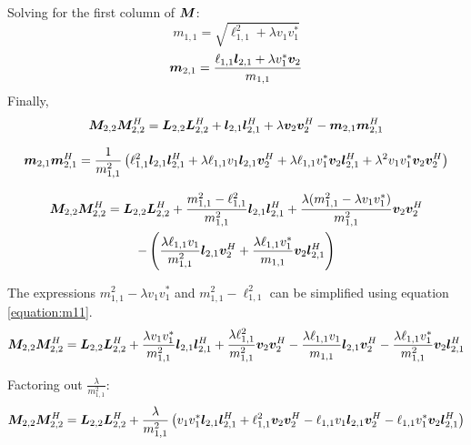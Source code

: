 \begin{appendices}
Solving for the first column of $\bm{M}$:
\begin{equation} \label{equation:m11}
m_{1,1} = \sqrt{\ell_{1,1}^2 + \lambda v_1 v_1^{*}}
\end{equation}
\begin{equation}
\bm{m}_{2,1} = \frac{\ell_{1,1}\bm{l}_{2,1} + \lambda v_1^{*}\bm{v}_2}{m_{1,1}}
\end{equation}
Finally,
\begin{equation}
\bm{M}_{2,2}\bm{M}_{2,2}^H = \bm{L}_{2,2}\bm{L}_{2,2}^H + \bm{l}_{2,1}\bm{l}_{2,1}^H + \lambda\bm{v}_2\bm{v}_2^H - \bm{m}_{2,1}\bm{m}_{2,1}^H
\end{equation}

\begin{equation}
\bm{m}_{2,1}\bm{m}_{2,1}^H = \frac{1}{m_{1,1}^2}\left(\ell_{1,1}^2\bm{l}_{2,1}\bm{l}_{2,1}^H + \lambda\ell_{1,1}v_1\bm{l}_{2,1}\bm{v}_2^H + \lambda\ell_{1,1}v_1^{*}\bm{v}_2\bm{l}_{2,1}^H + \lambda^2 v_1 v_1^{*} \bm{v}_2\bm{v}_2^H\right)
\end{equation}

\begin{multline}
\bm{M}_{2,2}\bm{M}_{2,2}^H = \bm{L}_{2,2}\bm{L}_{2,2}^H + \frac{m_{1,1}^2 - \ell_{1,1}^2}{m_{1,1}^2}\bm{l}_{2,1}\bm{l}_{2,1}^H + \frac{\lambda(m_{1,1}^2 - \lambda v_1 v_1^{*})}{m_{1,1}^2}\bm{v}_2\bm{v}_2^H \\- \left(\frac{\lambda\ell_{1,1}v_1}{m_{1,1}^2}\bm{l}_{2,1}\bm{v}_2^H + \frac{\lambda\ell_{1,1}v_1^{*}}{m_{1,1}}\bm{v}_2\bm{l}_{2,1}^H\right)
\end{multline}

The expressions $m_{1,1}^2 - \lambda v_1 v_1^{*}$ and $m_{1,1}^2 - \ell_{1,1}^2$ can be simplified using equation \ref{equation:m11}.
\begin{equation}
\bm{M}_{2,2}\bm{M}_{2,2}^H = \bm{L}_{2,2}\bm{L}_{2,2}^H + \frac{\lambda v_1 v_1^{*} }{m_{1,1}^2}\bm{l}_{2,1}\bm{l}_{2,1}^H + \frac{\lambda \ell_{1,1}^2}{m_{1,1}^2}\bm{v}_2\bm{v}_2^H - \frac{\lambda\ell_{1,1}v_1}{m_{1,1}}\bm{l}_{2,1}\bm{v}_2^H - \frac{\lambda\ell_{1,1}v_1^{*}}{m_{1,1}^2}\bm{v}_2\bm{l}_{2,1}^H
\end{equation}

Factoring out $\frac{\lambda}{m_{1,1}^2}$:
\begin{equation}
\bm{M}_{2,2}\bm{M}_{2,2}^H = \bm{L}_{2,2}\bm{L}_{2,2}^H + \frac{\lambda}{m_{1,1}^2}\left( v_1 v_1^{*} \bm{l}_{2,1}\bm{l}_{2,1}^H + \ell_{1,1}^2\bm{v}_2\bm{v}_2^H - \ell_{1,1}v_1\bm{l}_{2,1}\bm{v}_2^H - \ell_{1,1}v_1^{*}\bm{v}_2\bm{l}_{2,1}^H\right)
\end{equation}


\end{appendices}
